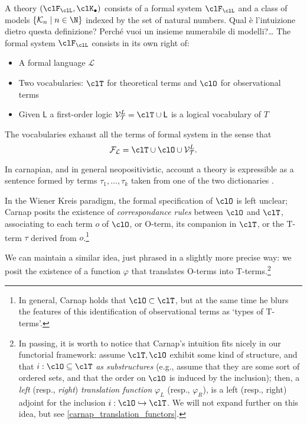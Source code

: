 \begin{definition}
	A theory $(\clF_\clL, \clK_\bullet)$ consists of a formal system $\clF_\clL$ and a class of models $\{\mathcal{K}_n \mid n \in \N \}$ indexed by the set of natural numbers. 
	{\color{red} Qual è l'intuizione dietro questa definizione? Perché vuoi un insieme numerabile di modelli?\dots}
	The formal system $\clF_\clL$ consists in its own right of:
	\begin{itemize}
		\item A formal language $\mathcal{L}$ 
		\item Two vocabularies: $\clT$ for theoretical terms and $\clO$ for observational terms 
		\item Given $\mathsf{L}$ a first-order logic $\mathcal{V}_{\mathcal{T}}^L = \clT \cup \mathsf{L}$ is a logical vocabulary of $T$
	\end{itemize}    
\end{definition}
The vocabularies exhaust all the terms of formal system in the sense that 
\[\mathcal{F_L} = \clT \cup \clO \cup \mathcal{V}_{\mathcal{T}}^L.\]

In carnapian, and in general neopositivistic, account a theory is expressible as a sentence formed by terms $\tau_1, \dots, \tau_k$ taken from one of the two dictionaries \cite{?}. 

In the Wiener Kreis paradigm, the formal specification of $\clO$ is left unclear; Carnap \cite{carnapfound} posits the existence of \emph{correspondance rules} between $\clO$ and $\clT$, associating to each term $o$ of $\clO$, or O-term, its companion in $\clT$, or the T-term $\tau$ derived from $o$.\footnote{In general, Carnap holds that $\clO \subset \clT$, but at the same time he blurs the features of this identification of observational terms as `types of T-terms'.}

We can maintain a similar idea, just phrased in a slightly more precise way: we posit the existence of a function $\varphi$ that translates O-terms into T-terms.\footnote{In passing, it is worth to notice that Carnap's intuition fits nicely in our functorial framework: assume $\clT, \clO$ exhibit some kind of structure, and that $i : \clO\subseteq\clT$ \emph{as substructures} (e.g., assume that they are some sort of ordered sets, and that the order on $\clO$ is induced by the inclusion); then, a \emph{left} (resp., \emph{right}) \emph{translation function} $\varphi_L$ (resp., $\varphi_R$), is a left (resp., right) adjoint for the inclusion $i : \clO\hookrightarrow \clT$. We will not expand further on this idea, but see \autoref{carnap_translation_functors}.}

